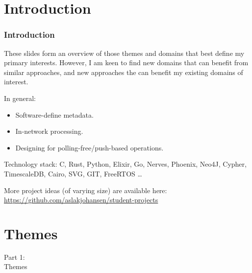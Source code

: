 \section{Introduction}
\begin{frame}
    \frametitle{Introduction}
    \vspace{3mm}
    These slides form an overview of those themes and domains that best define my primary interests. However, I am keen to find new domains that can benefit from similar approaches, and new approaches the can benefit my existing domains of interest.
    
    \vspace{3mm}
    In general:
    \begin{itemize}
      \item Software-define metadata.
      \item In-network processing.
      \item Designing for polling-free/push-based operations.
    \end{itemize}
    
    \vspace{3mm}
    Technology stack: C, Rust, Python, Elixir, Go, Nerves, Phoenix, Neo4J, Cypher, TimescaleDB, Cairo, SVG, GIT, FreeRTOS \ldots
    
    \vspace{3mm}
    More project ideas (of varying size) are available here: \url{https://github.com/aslakjohansen/student-projects}
\end{frame}

\section{Themes}
\begin{frame}
    \vspace{25mm}
    \begin{center}
        \Huge{Part 1:\\Themes}
    \end{center}
\end{frame}

